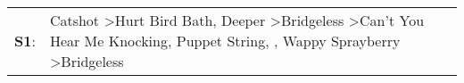 \begin{supertabular}{p{0.03\textwidth}p{0.92\textwidth}}
 \textbf{S1}:  &  Catshot\textsuperscript{} \textgreater \enspace Hurt Bird Bath\textsuperscript{}, \enspace Deeper\textsuperscript{} \textgreater \enspace Bridgeless\textsuperscript{} \textgreater \enspace Can't You Hear Me Knocking\textsuperscript{}, \enspace Puppet String\textsuperscript{}, \textsuperscript{}, \enspace Wappy Sprayberry\textsuperscript{} \textgreater \enspace Bridgeless\textsuperscript{}  \enspace  \\
\end{supertabular}
